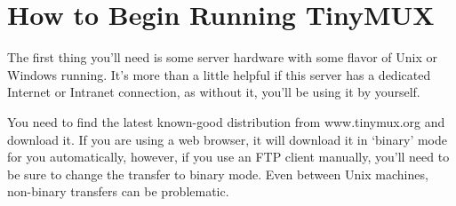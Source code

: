 \documentclass[10pt,letterpaper]{book}
\begin{document}
\section{How to Begin Running TinyMUX}
The first thing you'll need is some server hardware with some flavor of Unix or
Windows running. It's more than a little helpful if this server has a dedicated
Internet or Intranet connection, as without it, you'll be using it by yourself.

You need to find the latest known-good distribution from
www.tinymux.org and download it. If you are using a web browser, it will
download it in `binary' mode for you automatically, however, if you use an FTP
client manually, you'll need to be sure to change the transfer to binary mode.
Even between Unix machines, non-binary transfers can be problematic.
\end{document}
